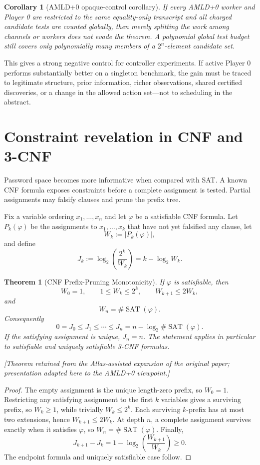 \documentclass[11pt]{article}
\newtheorem{theorem}[definition]{Theorem}
\newtheorem{corollary}[definition]{Corollary}
\newcommand{\atlasnote}{\par\smallskip\noindent\textit{[Theorem retained from the Atlas-assisted expansion of the original paper; presentation adapted here to the AMLD+0 viewpoint.] }\par\smallskip}
\begin{document}
\begin{corollary}[AMLD+0 opaque-control corollary]
If every AMLD+0 worker and Player 0 are restricted to the same equality-only
transcript and all charged candidate tests are counted globally, then merely
splitting the work among channels or workers does not evade the theorem.  A
polynomial global test budget still covers only polynomially many members of a
$2^n$-element candidate set.
\end{corollary}

This gives a strong negative control for controller experiments.  If active
Player 0 performs substantially better on a singleton benchmark, the gain must
be traced to legitimate structure, prior information, richer observations,
shared certified discoveries, or a change in the allowed action set---not to
scheduling in the abstract.

\section{Constraint revelation in CNF and 3-CNF}

Password space becomes more informative when compared with SAT.  A known CNF
formula exposes constraints before a complete assignment is tested.  Partial
assignments may falsify clauses and prune the prefix tree.

Fix a variable ordering $x_1,\ldots,x_n$ and let $\varphi$ be a satisfiable CNF
formula.  Let $P_k(\varphi)$ be the assignments to $x_1,\ldots,x_k$ that have
not yet falsified any clause, let
\[
W_k:=|P_k(\varphi)|,
\]
and define
\[
J_k:=\log_2\!\left(\frac{2^k}{W_k}\right)
    =k-\log_2 W_k.
\]

\begin{theorem}[CNF Prefix-Pruning Monotonicity]
If $\varphi$ is satisfiable, then
\[
W_0=1,\qquad 1\le W_k\le 2^k,\qquad W_{k+1}\le 2W_k,
\]
and
\[
W_n=\#\operatorname{SAT}(\varphi).
\]
Consequently
\[
\boxed{
0=J_0\le J_1\le\cdots\le J_n
=n-\log_2\#\operatorname{SAT}(\varphi).}
\]
If the satisfying assignment is unique, $J_n=n$.  The statement applies in
particular to satisfiable and uniquely satisfiable 3-CNF formulas.
\end{theorem}
\atlasnote

\begin{proof}
The empty assignment is the unique length-zero prefix, so $W_0=1$.
Restricting any satisfying assignment to the first $k$ variables gives a
surviving prefix, so $W_k\ge1$, while trivially $W_k\le2^k$.  Each surviving
$k$-prefix has at most two extensions, hence $W_{k+1}\le2W_k$.  At depth $n$,
a complete assignment survives exactly when it satisfies $\varphi$, so
$W_n=\#\operatorname{SAT}(\varphi)$.  Finally,
\[
J_{k+1}-J_k
=1-\log_2\!\left(\frac{W_{k+1}}{W_k}\right)\ge0.
\]
The endpoint formula and uniquely satisfiable case follow.
\end{proof}
\end{document}
